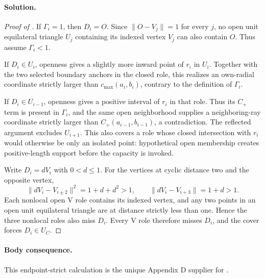 \paragraph{Solution.}

\begin{proof}[Proof of ]
If $\Gamma_i=1$, then $D_i=O$.  Since
$\lVert O-V_j\rVert=1$ for every $j$, no open unit equilateral triangle
$U_j$ containing its indexed vertex $V_j$ can also contain $O$.  Thus assume
$\Gamma_i<1$.

If $D_i\in U_i$, openness gives a slightly more inward point of $r_i$ in
$U_i$.  Together with the two selected boundary anchors in the closed role,
this realizes an own-radial coordinate strictly larger than
$c_{\max}(a_i,b_i)$, contrary to the definition of $\Gamma_i$.

If $D_i\in U_{i-1}$, openness gives a positive interval of $r_i$ in that
role.  Thus its $C_+$ term is present in $\Gamma_i$, and the same open
neighborhood supplies a neighboring-ray coordinate strictly larger than
$C_+(a_{i-1},b_{i-1})$, a contradiction.  The reflected argument excludes
$U_{i+1}$.  This also covers a role whose closed intersection with $r_i$
would otherwise be only an isolated point: hypothetical open membership
creates positive-length support before the capacity is invoked.

Write $D_i=dV_i$ with $0<d\le1$.  For the vertices at cyclic distance two
and the opposite vertex,
\[
 \lVert dV_i-V_{i\pm2}\rVert^2=1+d+d^2>1,
 \qquad
 \lVert dV_i-V_{i+3}\rVert=1+d>1.
\]
Each nonlocal open V role contains its indexed vertex, and any two points in
an open unit equilateral triangle are at distance strictly less than one.
Hence the three nonlocal roles also miss $D_i$.  Every V role therefore
misses $D_i$, and the cover forces $D_i\in U_C$.
\end{proof}

\paragraph{Body consequence.}
This endpoint-strict calculation is the unique Appendix D supplier for
.
